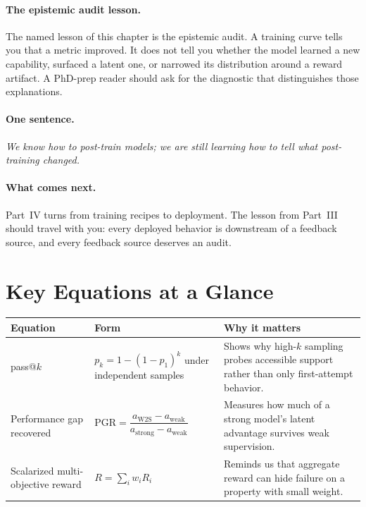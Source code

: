 \paragraph{The epistemic audit lesson.} The named lesson of this chapter is the epistemic audit. A training curve tells you that a metric improved. It does not tell you whether the model learned a new capability, surfaced a latent one, or narrowed its distribution around a reward artifact. A PhD-prep reader should ask for the diagnostic that distinguishes those explanations.

\paragraph{One sentence.} \emph{We know how to post-train models; we are still learning how to tell what post-training changed.}

\paragraph{What comes next.} Part~IV turns from training recipes to deployment. The lesson from Part~III should travel with you: every deployed behavior is downstream of a feedback source, and every feedback source deserves an audit.

\section*{Key Equations at a Glance}

\begin{center}
\small
\begin{tabularx}{\textwidth}{@{}p{3.5cm}p{5.2cm}X@{}}
\toprule
\textbf{Equation} & \textbf{Form} & \textbf{Why it matters} \\
\midrule
pass@$k$ & $p_k = 1 - (1-p_1)^k$ under independent samples & Shows why high-$k$ sampling probes accessible support rather than only first-attempt behavior. \\
Performance gap recovered & $\text{PGR} = \dfrac{a_{\text{W2S}} - a_{\text{weak}}}{a_{\text{strong}} - a_{\text{weak}}}$ & Measures how much of a strong model's latent advantage survives weak supervision. \\
Scalarized multi-objective reward & $R = \sum_i w_i R_i$ & Reminds us that aggregate reward can hide failure on a property with small weight. \\
\bottomrule
\end{tabularx}
\normalsize
\end{center}

